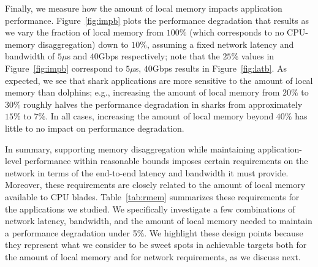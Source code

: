 %
Finally, we measure how the amount of local memory impacts application performance.
Figure~\ref{fig:impb} plots the performance degradation that results as we vary the 
fraction of local memory from $100\%$ (which corresponds to no CPU-memory disaggregation) down to $10\%$, assuming a fixed network latency and bandwidth of $5\mu$s and $40$Gbps respectively; note that the $25\%$ values in Figure~\ref{fig:impb} correspond to $5\mu$s, $40$Gbps results in Figure~\ref{fig:latb}. 
As expected, we see that shark applications are more sensitive to the amount of local memory than dolphins; e.g., increasing the amount of local memory from $20\%$ to $30\%$ roughly halves the performance degradation in sharks from approximately $15\%$ to $7\%$.
In all cases, increasing the amount of local memory beyond $40\%$ has little to no impact on performance degradation.

In summary, supporting memory disaggregation while maintaining application-level performance within reasonable bounds imposes certain requirements on the network in terms of the end-to-end latency and bandwidth it must provide. Moreover, these requirements are closely related to the amount of local memory available to CPU blades. Table~\ref{tab:rmem} summarizes these requirements for the applications we studied. We specifically investigate a few combinations of network latency, bandwidth, and the amount of local memory needed to maintain a performance degradation under 5\%. 
We highlight these design points because they represent what we consider to be sweet spots in achievable targets both for the amount of local memory and for network requirements, as we discuss next.




